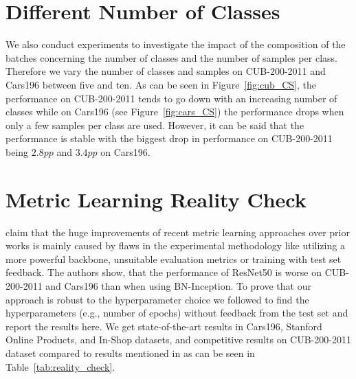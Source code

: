 \documentclass{article}
\begin{document}
\section{Different Number of Classes}
\label{sec:CS}
We also conduct experiments to investigate the impact of the composition of the batches concerning the number of classes and the number of samples per class. 
Therefore we vary the number of classes and samples on CUB-200-2011 and Cars196 between five and ten. As can be seen in Figure~\ref{fig:cub_CS}, the performance on CUB-200-2011 tends to go down with an increasing number of classes while on Cars196 (see Figure~\ref{fig:cars_CS}) the performance drops when only a few samples per class are used. However, it can be said that the performance is stable with the biggest drop in performance on CUB-200-2011 being $2.8pp$ and $3.4pp$ on Cars196.

\vspace{-0.1cm}
\section{Metric Learning Reality Check}
\label{sec:Reality_Check}
\cite{DBLP:conf/eccv/MusgraveBL20} claim that the huge improvements of recent metric learning approaches over prior works is mainly caused by flaws in the experimental methodology like utilizing a more powerful backbone, unsuitable evaluation metrics or training with test set feedback. The authors show, that the performance of ResNet50 is worse on CUB-200-2011 and Cars196 than when using BN-Inception. To prove that our approach is robust to the hyperparameter choice we followed \cite{DBLP:conf/eccv/MusgraveBL20}  to find the hyperparameters (e.g., number of epochs) without feedback from the test set and report the results here. We get state-of-the-art results in Cars196, Stanford Online Products, and In-Shop datasets, and competitive results on CUB-200-2011 dataset compared to results mentioned in \cite{DBLP:conf/eccv/MusgraveBL20} as can be seen in Table~\ref{tab:reality_check}.

\begin{table}
\centering
{}
\caption{Performance of our approach following \cite{DBLP:conf/eccv/MusgraveBL20} to find the hyperparameters (e.g., number of epochs) without feedback from the test set.}
\label{tab:reality_check}
\end{table} \vspace{-0.2cm}
\end{document}
